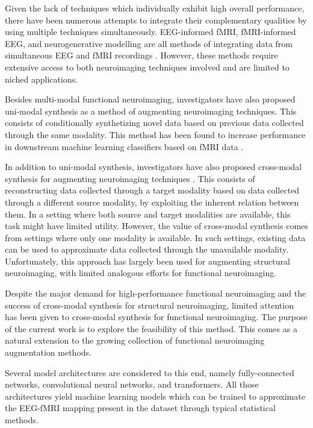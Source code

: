 \documentclass{article}
\begin{document}
Given the lack of techniques which individually exhibit high overall performance, there have been numerous attempts to integrate their complementary qualities by using multiple techniques simultaneously. EEG-informed fMRI, fMRI-informed EEG, and neurogenerative modelling are all methods of integrating data from simultaneous EEG and fMRI recordings \cite{huster_methods_2012}. However, these methods require extensive access to both neuroimaging techniques involved and are limited to niched applications. 

Besides multi-modal functional neuroimaging, investigators have also proposed uni-modal synthesis as a method of augmenting neuroimaging techniques. This consists of conditionally synthetizing novel data based on previous data collected through the same modality. This method has been found to increase performance in downstream machine learning classifiers based on fMRI data \cite{zhuang_fmri_2019}.

In addition to uni-modal synthesis, investigators have also proposed cross-modal synthesis for augmenting neuroimaging techniques \cite{yi_generative_2019}. This consists of reconstructing data collected through a target modality based on data collected through a different source modality, by exploiting the inherent relation between them. In a setting where both source and target modalities are available, this task might have limited utility. However, the value of cross-modal synthesis comes from settings where only one modality is available. In such settings, existing data can be used to approximate data collected through the unavailable modality. Unfortunately, this approach has largely been used for augmenting structural neuroimaging, with limited analogous efforts for functional neuroimaging.

Despite the major demand for high-performance functional neuroimaging and the success of cross-modal synthesis for structural neuroimaging, limited attention has been given to cross-modal synthesis for functional neuroimaging. The purpose of the current work is to explore the feasibility of this method. This comes as a natural extension to the growing collection of functional neuroimaging augmentation methods.

Several model architectures are considered to this end, namely fully-connected networks, convolutional neural networks, and transformers. All those architectures yield machine learning models which can be trained to approximate the EEG-fMRI mapping present in the dataset through typical statistical methods. 
\end{document}
